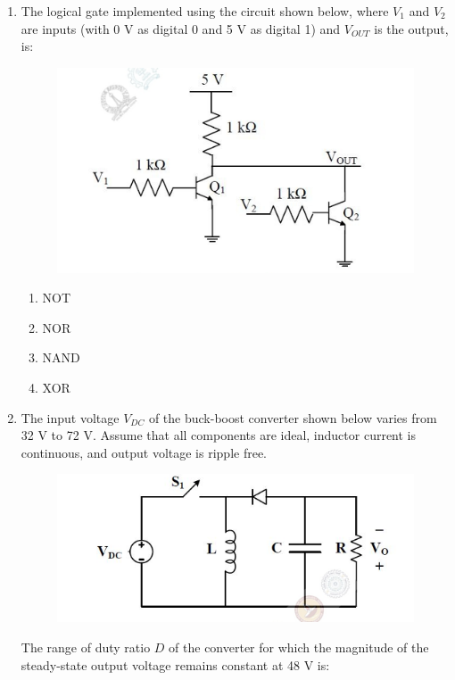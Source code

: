 \documentclass[journal,12pt,onecolumn]{IEEEtran}
\theoremstyle{remark}
\begin{document}
\begin{enumerate}
\begin{multicols}{2}
\begin{enumerate}
\item $\overline{B}D + BCD$
\item $\overline{B}D + AB$
\item $\overline{B}D + ABC$
\item $\overline{B}D + ABC$
\end{enumerate}
\end{multicols}

\item The logical gate implemented using the circuit shown below, where $V_1$ and $V_2$ are inputs (with 0 V as digital 0 and 5 V as digital 1) and $V_{OUT}$ is the output, is:  

\begin{figure}[H]
    \centering
    \includegraphics[width=0.5\columnwidth]{figs/37.png}
    \caption{}
    \label{fig:placeholder}
\end{figure}

\begin{multicols}{2}
\begin{enumerate}
\item NOT
\item NOR
\item NAND
\item XOR
\end{enumerate}
\end{multicols}

\item The input voltage $V_{DC}$ of the buck-boost converter shown below varies from 32 V to 72 V.  
Assume that all components are ideal, inductor current is continuous, and output voltage is ripple free. 
\begin{figure}[H]
    \centering
    \includegraphics[width=0.5\columnwidth]{figs/38.png}
    \caption{}
    \label{fig:placeholder}
\end{figure}
The range of duty ratio $D$ of the converter for which the magnitude of the steady-state output voltage remains constant at 48 V is:  




\end{enumerate}
\end{document}
